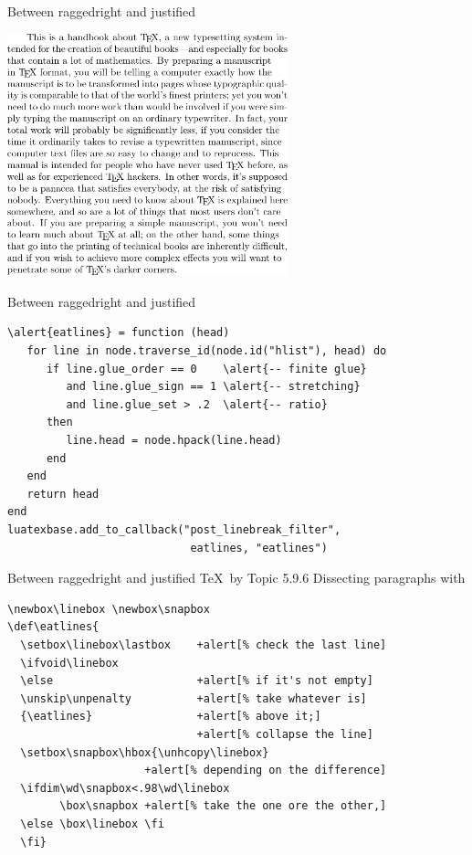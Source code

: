 \documentclass[t,10pt]{beamer}
\begin{document}
\begin{frame}[fragile]{Between raggedright and justified}
  \begin{center}
    \includegraphics[width=3.2in]{victor.pdf}
  \end{center}
\end{frame}

\begin{frame}[fragile]{Between raggedright and justified}
  \begin{Verbatim}[fontsize=\small,commandchars=\\\{\}]
\alert{eatlines} = function (head)
   for line in node.traverse_id(node.id("hlist"), head) do
      if line.glue_order == 0    \alert{-- finite glue}
         and line.glue_sign == 1 \alert{-- stretching}
         and line.glue_set > .2  \alert{-- ratio}
      then
         line.head = node.hpack(line.head)
      end
   end
   return head
end
luatexbase.add_to_callback("post_linebreak_filter",
                            eatlines, "eatlines")
  \end{Verbatim}
\end{frame}

\begin{frame}[fragile]{Between raggedright and justified}
  \alert{\TeX\ by Topic} 5.9.6 Dissecting paragraphs with
  \texttt{\string\lastbox}
  \begin{Verbatim}[fontsize=\small,commandchars=+\[\]]
\newbox\linebox \newbox\snapbox
\def\eatlines{
  \setbox\linebox\lastbox    +alert[% check the last line]
  \ifvoid\linebox
  \else                      +alert[% if it's not empty]
  \unskip\unpenalty          +alert[% take whatever is]
  {\eatlines}                +alert[% above it;]
                             +alert[% collapse the line]
  \setbox\snapbox\hbox{\unhcopy\linebox}
                     +alert[% depending on the difference]
  \ifdim\wd\snapbox<.98\wd\linebox
        \box\snapbox +alert[% take the one ore the other,]
  \else \box\linebox \fi
  \fi}
  \end{Verbatim}
\end{frame}
\end{document}
